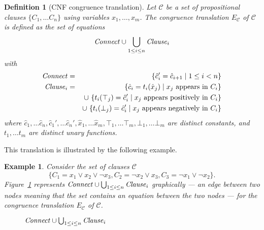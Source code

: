 \documentclass{easychair}
\newtheorem{example}{Example}
\newtheorem{definition}{Definition}
\begin{document}
\begin{definition}[CNF congruence translation]

Let $\mathcal{C}$ be a set of propositional clauses $\{C_1,\ldots C_n\}$ using variables $x_1,\ldots,x_m$.
The congruence translation $E_{\mathcal{C}}$ of $\mathcal{C}$ is defined as the set of equations
\begin{equation*}
{\it Connect} \cup \bigcup_{1 \leq i \leq n}{\it Clause}_i 
\end{equation*}
with
\begin{eqnarray*}
	{\it Connect} &=& \{ \hat{c}_{i}' = \hat{c}_{i+1} \mid 1 \leq i < n\}\\
        {\it Clause}_i &=& \{ \hat{c}_i = t_i(\hat{x}_j) \mid x_j \text{ appears in } C_i \}\\
           & & \cup\ \{ t_i(\top_j) = \hat{c}_i' \mid x_j \text{ appears positively in } C_i \}\\
           & & \cup\ \{ t_i(\bot_j) = \hat{c}_i' \mid x_j \text{ appears negatively in } C_i \}
\end{eqnarray*}
where $\hat{c}_{1},\dots \hat{c}_{n},\hat{c}_{1}', \dots \hat{c}_{n}',
\hat{x}_1, \dots \hat{x}_m, \top_1, \dots \top_m, \bot_1, \dots \bot_m$ are distinct constants, and $t_1, \dots t_m$ are
distinct unary functions.

\end{definition}

\noindent This translation is illustrated by the following example.

\begin{example}\label{ex:np1}
Consider the set of clauses $\mathcal{C}$
\begin{equation*}
\big\{C_1 = x_1 \vee x_2 \vee \neg x_3, C_2 = \neg x_2 \vee x_3, C_3 = \neg x_1 \vee \neg x_2\big\}.
\end{equation*}
Figure~\ref{fig:npexamplebig} represents ${\it Connect} \cup \bigcup_{1 \leq i \leq n}{\it Clause}_i$
graphically --- an edge between two nodes meaning that the set contains an
equation between the two nodes --- for the congruence translation $E_{\mathcal{C}}$ of
$\mathcal{C}$.

\begin{figure}[ht]

\caption{${\it Connect} \cup \bigcup_{1 \leq i \leq n}{\it Clause}_i$}
\label{fig:npexamplebig}
\end{figure}

\end{example}
\end{document}
